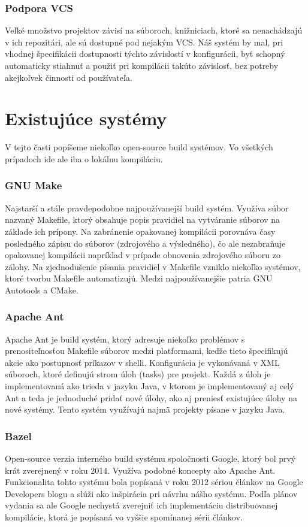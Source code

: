 \subsubsection{Podpora VCS}
Veľké množstvo projektov závisí na súboroch, knižniciach, ktoré sa nenachádzajú
v ich repozitári, ale sú dostupné pod nejakým VCS\@. Náš systém by mal, pri
vhodnej špecifikácii dostupnosti týchto závislostí v konfigurácii, byť schopný
automaticky stiahnuť a použiť pri kompilácii takúto závislosť, bez potreby akejkoľvek
činnosti od používateľa.

\section{Existuj\'{u}ce syst\'{e}my}
\label{sec:existing}
V tejto časti popíšeme niekoľko open-source build systémov. Vo všetkých prípadoch
ide ale iba o lokálnu kompiláciu.

\subsubsection{GNU Make}
Najstarší a stále pravdepodobne najpoužívanejší build systém. Využíva súbor
nazvaný Makefile, ktorý obsahuje popis pravidiel na vytváranie súborov na základe
ich prípony. Na zabránenie opakovanej kompilácii porovnáva časy posledného zápisu
do súborov (zdrojového a výsledného), čo ale nezabraňuje opakovanej kompilácii
napríklad v prípade obnovenia zdrojového súboru zo zálohy. Na zjednodušenie písania
pravidiel v Makefile vzniklo niekoľko systémov, ktoré tvorbu Makefile automatizujú.
Medzi najpoužívanejšie patria GNU Autotools a CMake.

\subsubsection{Apache Ant}
Apache Ant je build systém, ktorý adresuje niekoľko problémov s prenositeľnosťou
Makefile súborov medzi platformami, keďže tieto špecifikujú akcie ako postupnosť
príkazov v shelli. Konfigurácia je vykonávaná v XML súboroch, ktoré definujú
strom úloh (tasks) pre projekt. Každá z úloh je implementovaná ako trieda v
jazyku Java, v ktorom je implementovaný aj celý Ant a teda je jednoduché
pridať nové úlohy, ako aj preniesť existujúce úlohy na nové systémy. Tento systém
využívajú najmä projekty písane v jazyku Java.

\subsubsection{Bazel}
Open-source verzia interného build systému spoločnosti Google, ktorý bol prvý krát
zverejnený v roku 2014. Využíva podobné koncepty ako Apache Ant. Funkcionalita tohto
systému bola popísaná v roku 2012 sériou článkov na Google Developers blogu
\cite{BlazeDesign} a slúži ako inšpirácia pri návrhu nášho systému. Podľa plánov
vydania \cite{BazelRoadmap} sa ale Google nechystá zverejniť ich implementáciu
distribuovanej kompilácie, ktorá je popísaná vo vyššie spomínanej sérii článkov.

